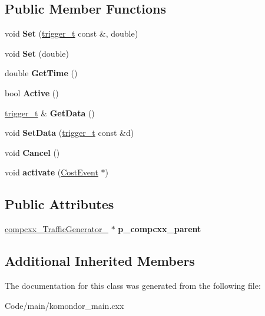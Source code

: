 \subsection*{Public Member Functions}
\begin{DoxyCompactItemize}
\item 
\mbox{\label{classcompcxx__Timer__19_a890822acebfe6c41eacbe0e56590fa4b}} 
void {\bfseries Set} (\hyperlink{classtrigger__t}{trigger\+\_\+t} const \&, double)
\item 
\mbox{\label{classcompcxx__Timer__19_a57e60e14bb14f7d25a56001492924907}} 
void {\bfseries Set} (double)
\item 
\mbox{\label{classcompcxx__Timer__19_adaf3528cf9b3f71483052b1681af7647}} 
double {\bfseries Get\+Time} ()
\item 
\mbox{\label{classcompcxx__Timer__19_ae046f9b3dc0126970a23340a58d7e725}} 
bool {\bfseries Active} ()
\item 
\mbox{\label{classcompcxx__Timer__19_a2ee4fbceb2884cba8664d3beef83a3c5}} 
\hyperlink{classtrigger__t}{trigger\+\_\+t} \& {\bfseries Get\+Data} ()
\item 
\mbox{\label{classcompcxx__Timer__19_a683a9c82f0cf1b4816d2c1234fd367b6}} 
void {\bfseries Set\+Data} (\hyperlink{classtrigger__t}{trigger\+\_\+t} const \&d)
\item 
\mbox{\label{classcompcxx__Timer__19_aac49ad916ffaa0d4ef75249d5a9d9844}} 
void {\bfseries Cancel} ()
\item 
\mbox{\label{classcompcxx__Timer__19_ad8c35dda9c46490e6f7990e0c3aa4fcf}} 
void {\bfseries activate} (\hyperlink{structCostEvent}{Cost\+Event} $\ast$)
\end{DoxyCompactItemize}
\subsection*{Public Attributes}
\begin{DoxyCompactItemize}
\item 
\mbox{\label{classcompcxx__Timer__19_a132d8e61cfa9450e522c92dcd37e184e}} 
\hyperlink{classcompcxx__TrafficGenerator__24}{compcxx\+\_\+\+Traffic\+Generator\+\_} $\ast$ {\bfseries p\+\_\+compcxx\+\_\+parent}
\end{DoxyCompactItemize}
\subsection*{Additional Inherited Members}


The documentation for this class was generated from the following file\+:\begin{DoxyCompactItemize}
\item 
Code/main/komondor\+\_\+main.\+cxx\end{DoxyCompactItemize}
